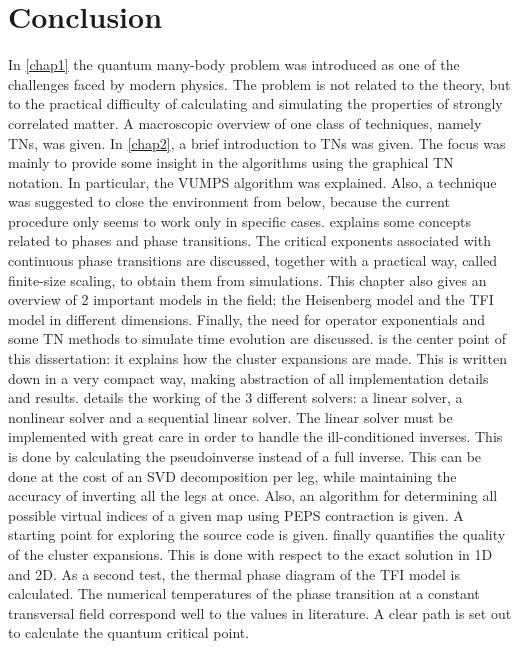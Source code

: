\section{Conclusion}

In \cref{chap1} the quantum many-body problem was introduced as one of the challenges faced by modern physics. The problem is not related to the theory, but to the practical difficulty of calculating and simulating the properties of strongly correlated matter. A macroscopic overview of one class of techniques, namely \Glspl{TN}, was given.
In \cref{chap2}, a brief introduction to \Glspl{TN} was given. The focus was mainly to provide some insight in the algorithms using the graphical \Gls{TN} notation. In particular, the \Gls{VUMPS} algorithm was explained. Also, a technique was suggested to close the environment from below, because the current procedure only seems to work only in specific cases.
 explains some concepts related to phases and phase transitions. The critical exponents associated with continuous phase transitions are discussed, together with a practical way, called finite-size scaling, to obtain them from simulations. This chapter also gives an overview of 2 important models in the field: the Heisenberg model and the \Gls{TFI} model in different dimensions. Finally, the need for operator exponentials and some \Gls{TN} methods to simulate time evolution are discussed.
 is the center point of this dissertation: it explains how the cluster expansions are made. This is written down in a very compact way, making abstraction of all implementation details and results.
 details the working of the 3 different solvers: a linear solver, a nonlinear solver and a sequential linear solver. The linear solver must be implemented with great care in order to handle the ill-conditioned inverses. This is done by calculating the pseudoinverse instead of a full inverse. This can be done at the cost of an \Gls{SVD} decomposition per leg, while maintaining the accuracy of inverting all the legs at once. Also, an algorithm for determining all possible virtual indices of a given map using \Gls{PEPS} contraction is given.  A starting point for exploring the source code is given.
 finally quantifies the quality of the cluster expansions. This is done with respect to the exact solution in 1D and 2D. As a second test, the thermal phase diagram of the \Gls{TFI} model is calculated. The numerical temperatures of the phase transition at a constant transversal field correspond well to the values in literature. A clear path is set out to calculate the quantum critical point.

